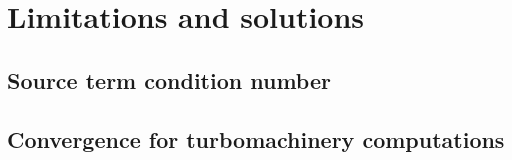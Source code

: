 
\chapter{Limitations and solutions}
\label{cha:limitations}

\chabstract{}

\minitoc
\newpage


\section{Source term condition number}
\label{sec:lim_condition}


\section{Convergence for turbomachinery computations}
\label{sec:lim_convergence}


\chconclu{}
